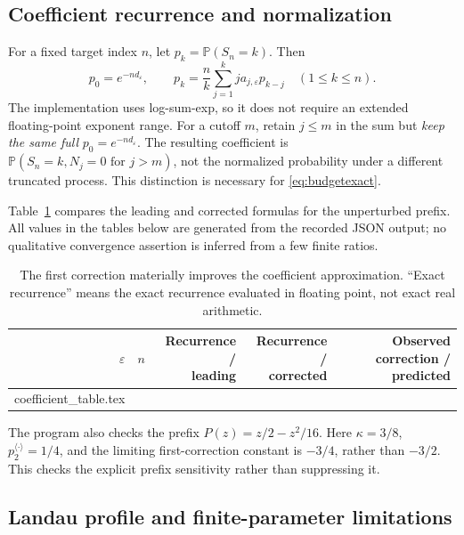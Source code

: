 \documentclass[11pt,a4paper]{article}
\makeatletter
\theoremstyle{definition}\newtheorem{definition}[theorem]{Definition}
\theoremstyle{remark}\newtheorem{remark}[theorem]{Remark}
\newcommand{\eps}{\varepsilon}
\newcommand{\Prob}{\mathbb P}
\newcommand{\1}{\mathbf 1}
\newcommand{\inputtable}[1]{\@@input #1 }
\makeatother
\begin{document}
\subsection{Coefficient recurrence and normalization}

For a fixed target index $n$, let
$p_k=\Prob(S_n=k)$. Then
\begin{equation}\label{eq:recurrence}
 p_0=e^{-nd_{\eps}},\qquad
 p_k=\frac nk\sum_{j=1}^k j a_{j,\eps}p_{k-j}\quad(1\le k\le n).
\end{equation}
The implementation uses log-sum-exp, so it does not require an extended
floating-point exponent range. For a cutoff $m$, retain $j\le m$ in the
sum but \emph{keep the same full} $p_0=e^{-nd_{\eps}}$. The resulting
coefficient is $\Prob(S_n=k, N_j=0\text{ for }j>m)$, not the normalized
probability under a different truncated process. This distinction is
necessary for \eqref{eq:budgetexact}.

Table~\ref{tab:coefficients} compares the leading and corrected formulas
for the unperturbed prefix. All values in the tables below are generated
from the recorded JSON output; no qualitative convergence assertion is
inferred from a few finite ratios.

\begin{table}[htbp]\centering\small
\begin{tabular}{@{}rrrrr@{}}
\toprule
$\eps$ & $n$ & \shortstack{Recurrence /\\leading} & \shortstack{Recurrence /\\corrected}
& \shortstack{Observed correction /\\predicted} \\
\midrule
\inputtable{coefficient_table.tex}
\bottomrule
\end{tabular}
\caption{The first correction materially improves the coefficient
approximation. ``Exact recurrence'' means the exact recurrence evaluated
in floating point, not exact real arithmetic.}
\label{tab:coefficients}
\end{table}

The program also checks the prefix
$P(z)=z/2-z^2/16$. Here $\kappa=3/8$,
$p_2^{\langle\cdot\rangle}=1/4$, and the limiting first-correction
constant is $-3/4$, rather than $-3/2$. This checks the explicit prefix
sensitivity rather than suppressing it.

\subsection{Landau profile and finite-parameter limitations}
\end{document}
